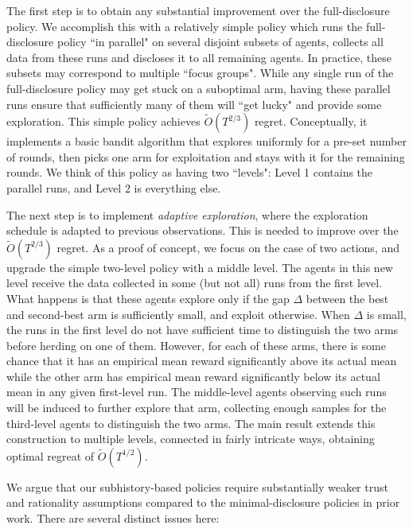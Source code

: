 The first step is to obtain any substantial improvement over the full-disclosure policy. We accomplish this with a relatively simple policy which runs the full-disclosure policy ``in parallel" on several disjoint subsets of agents,  collects all data from these runs and discloses it to all remaining agents. In practice, these subsets may correspond to multiple ``focus groups". While any single run of the full-disclosure policy may get stuck on a suboptimal arm, having these parallel runs ensure that sufficiently many of them will ``get lucky" and provide some exploration. This simple policy achieves $\tilde{O}(T^{2/3})$ regret. Conceptually, it implements a basic bandit algorithm that explores uniformly for a pre-set number of rounds, then picks one arm for exploitation and stays with it for the remaining rounds. We think of this policy  as having two ``levels": Level 1 contains the parallel runs, and Level 2 is everything else.

The next step is to implement \emph{adaptive exploration}, where the exploration schedule is adapted to previous observations. This is needed to improve over the $\tilde{O}(T^{2/3})$ regret. As a proof of concept, we focus on the case of two actions, and upgrade the simple two-level policy with a middle level. The agents in this new level receive the data collected in some (but not all) runs from the first level. What happens is that these agents explore only if the gap $\Delta$ between the best and second-best arm is sufficiently small, and exploit otherwise. When $\Delta$ is small, the runs in the first level do not have sufficient time to distinguish the two arms before herding on one of them.  However, for each of these arms, there is some chance that it has an empirical mean reward significantly above its actual mean while the other arm has empirical mean reward significantly below its actual mean in any given first-level run.  The middle-level agents observing such runs will be induced to further explore that arm, collecting enough samples for the third-level agents to distinguish the two arms. The main result extends this construction to multiple levels, connected in fairly intricate ways, obtaining optimal regreat of $\tilde{O}(T^{1/2})$.



We argue that our subhistory-based policies require substantially weaker trust and rationality assumptions compared to the minimal-disclosure policies in prior work. There are several distinct issues here:

